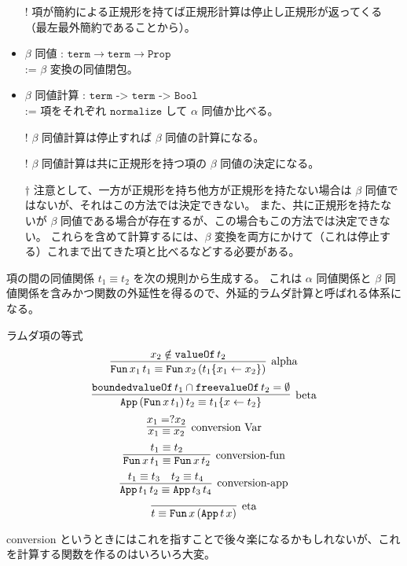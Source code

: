 \documentclass[dvipdfmx]{jsarticle}
\begin{document}
\begin{itemize}
  \item[!] 項が簡約による正規形を持てば正規形計算は停止し正規形が返ってくる（最左最外簡約であることから）。
  \item \(\beta\) 同値 : \(\texttt{term} \to \texttt{term} \to \texttt{Prop}\) \\
    := \(\beta\) 変換の同値閉包。
  \item \(\beta\) 同値計算 : \(\texttt{term -> term -> Bool}\) \\
    := 項をそれぞれ \(\texttt{normalize}\) して \(\alpha\) 同値か比べる。
  \item[!] \(\beta\) 同値計算は停止すれば \(\beta\) 同値の計算になる。
  \item[!] \(\beta\) 同値計算は共に正規形を持つ項の \(\beta\) 同値の決定になる。 
  \item[\(\dagger\)] 注意として、一方が正規形を持ち他方が正規形を持たない場合は \(\beta\) 同値ではないが、それはこの方法では決定できない。
    また、共に正規形を持たないが \(\beta\) 同値である場合が存在するが、この場合もこの方法では決定できない。
    これらを含めて計算するには、\(\beta\) 変換を両方にかけて（これは停止する）これまで出てきた項と比べるなどする必要がある。
\end{itemize}

項の間の同値関係 \(t_1 \equiv t_2\) を次の規則から生成する。
これは \(\alpha\) 同値関係と \(\beta\) 同値関係を含みかつ関数の外延性を得るので、外延的ラムダ計算と呼ばれる体系になる。

\begin{itembox}[l]{ラムダ項の等式}
  \[\infer[\text{alpha}]{\texttt{Fun} \, x_1 \, t_1 \equiv \texttt{Fun} \, x_2 \, (t_1\{x_1 \leftarrow x_2\})}{x_2 \notin \texttt{valueOf} \, t_2}\]
  \[\infer[\text{beta}]{\texttt{App} \, (\texttt{Fun} \, x \, t_1) \, t_2 \equiv t_1\{x \leftarrow t_2\}}{\texttt{boundedvalueOf} \, t_1 \cap \texttt{freevalueOf} \, t_2 = \emptyset}\]
  \[\infer[\text{conversion Var}]{x_1 \equiv x_2}{x_1 =? x_2}\]
  \[\infer[\text{conversion-fun}]{\texttt{Fun} \, x \, t_1 \equiv \texttt{Fun} \, x \, t_2}{t_1 \equiv t_2}\]
  \[\infer[\text{conversion-app}]{\texttt{App} \, t_1 \, t_2 \equiv \texttt{App} \, t_3 \, t_4}{t_1 \equiv t_3 & t_2 \equiv t_4}\]
  \[\infer[\text{eta}]{t \equiv \texttt{Fun} \, x \, (\texttt{App} \, t \, x)}{}\]
\end{itembox}

conversion というときにはこれを指すことで後々楽になるかもしれないが、これを計算する関数を作るのはいろいろ大変。
\end{document}

